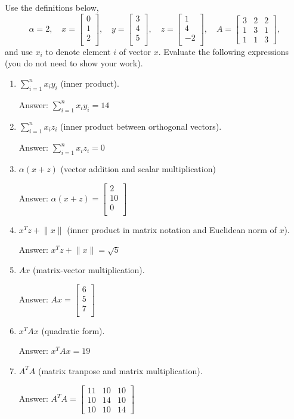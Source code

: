 \documentclass{article}
\newcommand{\blu}[1]{{\textcolor{blu}{#1}}}
\newcommand{\gre}[1]{\textcolor{gre}{#1}}
\newcommand\ans[1]{\par\gre{Answer: #1}}
\let\ask\blu
\newcommand{\norm}[1]{\lVert #1 \rVert}
\begin{document}
  Use the definitions below,
  \[
  \alpha = 2,\quad
  x = \left[\begin{array}{c}
  0\\
  1\\
  2\\
  \end{array}\right], \quad
  y = \left[\begin{array}{c}
  3\\
  4\\
  5\\
  \end{array}\right],\quad
  z = \left[\begin{array}{c}
  1\\
  4\\
  -2\\
  \end{array}\right],\quad
  A = \left[\begin{array}{ccc}
  3 & 2 & 2\\
  1 & 3 & 1\\
  1 & 1 & 3
  \end{array}\right],
  \]
  and use $x_i$ to denote element $i$ of vector $x$.
  \ask{Evaluate the following expressions} (you do not need to show your work).
  \begin{enumerate}
  \item $\sum_{i=1}^n x_iy_i$ (inner product).
  \ans{$\sum_{i=1}^n x_iy_i = 14$}
  \item $\sum_{i=1}^n x_i z_i$ (inner product between orthogonal vectors).
  \ans{$\sum_{i=1}^n x_i z_i = 0$}
  \item $\alpha(x+z)$ (vector addition and scalar multiplication)
  \ans{$\alpha(x+z) = \left[\begin{array}{c}2\\10\\0\\\end{array}\right]$}
  \item $x^Tz + \norm{x}$ (inner product in matrix notation and Euclidean norm of $x$).
  \ans{$x^Tz + \norm{x} = \sqrt{5}$}
  \item $Ax$ (matrix-vector multiplication).
  \ans{$Ax = \left[\begin{array}{c}6\\5\\7\\\end{array}\right]$}
  \item $x^TAx$ (quadratic form).
  \ans{$x^TAx = 19$}
  \item $A^TA$ (matrix tranpose and matrix multiplication).
  \ans{$A^TA = \left[\begin{array}{ccc}11 & 10 & 10\\10 & 14 & 10\\10 & 10 & 14\end{array}\right]$}
  \end{enumerate}
  \newpage
  
\end{document}
